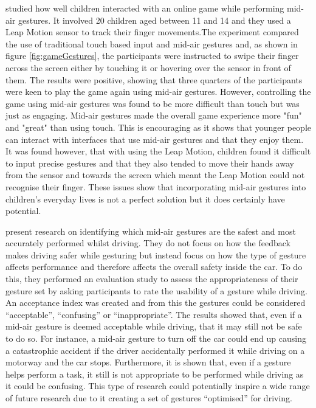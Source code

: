 \documentclass{l4proj}
\begin{document}
\cite{Moser_Tscheligi_2015} studied how well children interacted with an online game while performing mid-air gestures. It involved 20 children aged between 11 and 14 and they used a Leap Motion sensor to track their finger movements.The experiment compared the use of traditional touch based input and mid-air gestures and, as shown in figure \ref{fig:gameGestures}, the participants were instructed to swipe their finger across the screen either by touching it or hovering over the sensor in front of them. The results were positive, showing that three quarters of the participants were keen to play the game again using mid-air gestures. However, controlling the game using mid-air gestures was found to be more difficult than touch but was just as engaging. Mid-air gestures made the overall game experience more "fun" and "great" than using touch. This is encouraging as it shows that younger people can interact with interfaces that use mid-air gestures and that they enjoy them. It was found however, that with using the Leap Motion, children found it difficult to input precise gestures and that they also tended to move their hands away from the sensor and towards the screen which meant the Leap Motion could not recognise their finger. These issues show that incorporating mid-air gestures into children's everyday lives is not a perfect solution but it does certainly have potential.

\cite{Hessam_Zancanaro_Kavakli_Billinghurst_2017} present research on identifying which mid-air gestures are the safest and most accurately performed whilst driving. They do not focus on how the feedback makes driving safer while gesturing but instead focus on how the type of gesture affects performance and therefore affects the overall safety inside the car. To do this, they performed an evaluation study to assess the appropriateness of their gesture set by asking participants to rate the usability of a gesture while driving. An acceptance index was created and from this the gestures could be considered “acceptable”, “confusing” or “inappropriate”. The results showed that, even if a mid-air gesture is deemed acceptable while driving, that it may still not be safe to do so. For instance, a mid-air gesture to turn off the car could end up causing a catastrophic accident if the driver accidentally performed it while driving on a motorway and the car stops. Furthermore, it is shown that, even if a gesture helps perform a task, it still is not appropriate to be performed while driving as it could be confusing.  This type of research could potentially inspire a wide range of future research due to it creating a set of gestures “optimised” for driving.
\end{document}
